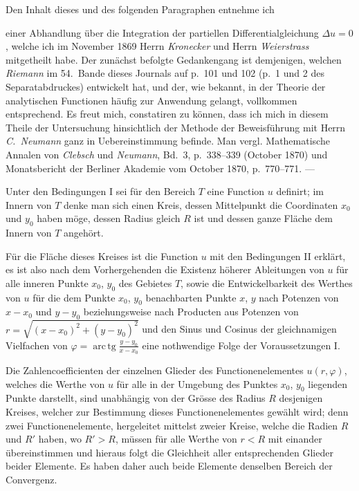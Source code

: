 \documentclass{article}
\begin{document}
Den Inhalt dieses und des folgenden Paragraphen entnehme ich

einer Abhandlung über die Integration der partiellen Differentialgleichung $\Delta u = 0$, welche ich im November 1869 Herrn \emph{Kronecker} und Herrn \emph{Weierstrass} mitgetheilt habe. Der zunächst befolgte Gedankengang ist demjenigen, welchen \emph{Riemann} im 54.~Bande dieses Journals auf p.~101 und 102 (p.~1 und 2 des Separatabdruckes) entwickelt hat, und der, wie bekannt, in der Theorie der analytischen Functionen häufig zur Anwendung gelangt, vollkommen entsprechend. Es freut mich, constatiren zu können, dass ich mich in diesem Theile der Untersuchung hinsichtlich der Methode der Beweisführung mit Herrn \emph{C.~Neumann} ganz in Uebereinstimmung befinde. Man vergl. Mathematische Annalen von \emph{Clebsch} und \emph{Neumann}, Bd.~3, p.~338--339 (October 1870) und Monatsbericht der Berliner Akademie vom October 1870, p.~770--771. ---

Unter den Bedingungen I sei für den Bereich $T$ eine Function $u$ definirt; im Innern von $T$ denke man sich einen Kreis, dessen Mittelpunkt die Coordinaten $x_0$ und $y_0$ haben möge, dessen Radius gleich $R$ ist und dessen ganze Fläche dem Innern von $T$ angehört.

Für die Fläche dieses Kreises ist die Function $u$ mit den Bedingungen II erklärt, es ist also nach dem Vorhergehenden die Existenz höherer Ableitungen von $u$ für alle inneren Punkte $x_0$, $y_0$ des Gebietes $T$, sowie die Entwickelbarkeit des Werthes von $u$ für die dem Punkte $x_0$, $y_0$ benachbarten Punkte $x$, $y$ nach Potenzen von $x - x_0$ und $y - y_0$ beziehungsweise nach Producten aus Potenzen von $r = \sqrt{(x - x_0)^2 + (y - y_0)^2}$ und den Sinus und Cosinus der gleichnamigen Vielfachen von $\varphi = \operatorname{arc\,tg}\frac{y - y_0}{x - x_0}$ eine nothwendige Folge der Voraussetzungen I.

Die Zahlencoefficienten der einzelnen Glieder des Functionenelementes $u(r, \varphi)$, welches die Werthe von $u$ für alle in der Umgebung des Punktes $x_0$, $y_0$ liegenden Punkte darstellt, sind unabhängig von der Grösse des Radius $R$ desjenigen Kreises, welcher zur Bestimmung dieses Functionenelementes gewählt wird; denn zwei Functionenelemente, hergeleitet mittelst zweier Kreise, welche die Radien $R$ und $R'$ haben, wo $R' > R$, müssen für alle Werthe von $r < R$ mit einander übereinstimmen und hieraus folgt die Gleichheit aller entsprechenden Glieder beider Elemente. Es haben daher auch beide Elemente denselben Bereich der Convergenz.
\end{document}
